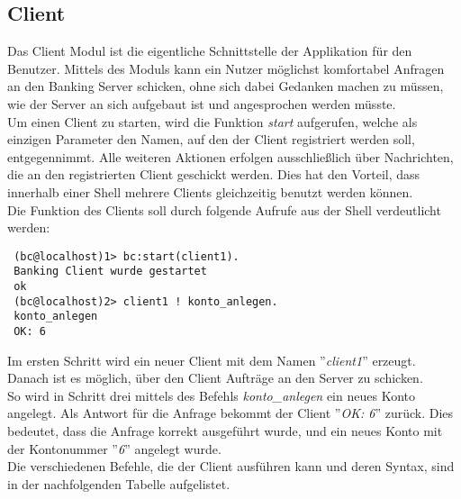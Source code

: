 \subsection{Client}
Das Client Modul ist die eigentliche Schnittstelle der Applikation für den Benutzer. Mittels des Moduls kann ein Nutzer möglichst komfortabel Anfragen an den Banking Server schicken, ohne sich dabei Gedanken machen zu müssen, wie der Server an sich aufgebaut ist und angesprochen werden müsste.\\
Um einen Client zu starten, wird die Funktion \textit{start} aufgerufen, welche als einzigen Parameter den Namen, auf den der Client registriert werden soll, entgegennimmt. Alle weiteren Aktionen erfolgen ausschließlich über Nachrichten, die an den registrierten Client geschickt werden. Dies hat den Vorteil, dass innerhalb einer Shell mehrere Clients gleichzeitig benutzt werden können.\\
Die Funktion des Clients soll durch folgende Aufrufe aus der Shell verdeutlicht werden:
\begin{lstlisting} 
 (bc@localhost)1> bc:start(client1).
 Banking Client wurde gestartet
 ok
 (bc@localhost)2> client1 ! konto_anlegen.
 konto_anlegen
 OK: 6
\end{lstlisting}
Im ersten Schritt wird ein neuer Client mit dem Namen ''\textit{client1}'' erzeugt. Danach ist es möglich, über den Client Aufträge an den Server zu schicken.\\ 
So wird in Schritt drei mittels des Befehls \textit{konto\_anlegen} ein neues Konto angelegt. Als Antwort für die Anfrage bekommt der Client ''\textit{OK: 6}'' zurück. Dies bedeutet, dass die Anfrage korrekt ausgeführt wurde, und ein neues Konto mit der Kontonummer ''\textit{6}'' angelegt wurde.\\
Die verschiedenen Befehle, die der Client ausführen kann und deren Syntax, sind in der nachfolgenden Tabelle aufgelistet.\\
